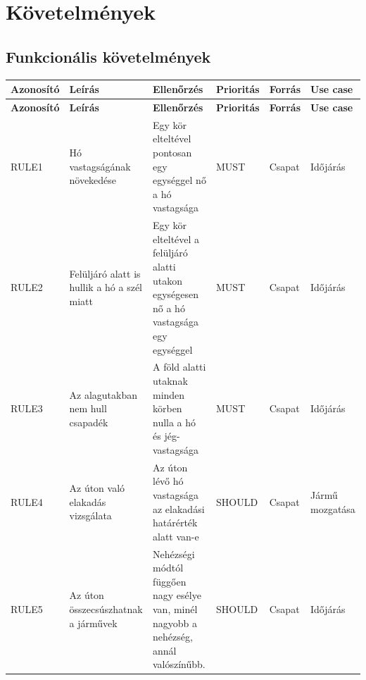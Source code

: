 \section{Követelmények}
\subsection{Funkcionális követelmények}

\begin{longtable}{| p{2cm} | p{4cm} | p{2.7cm} | p{2cm} | p{1.5cm} | p{2.0cm}|}
    \hline
    \textbf{Azonosító} & \textbf{Leírás} & \textbf{Ellenőrzés} & \textbf{Prioritás} & \textbf{Forrás} & \textbf{Use case}\\ 
    \hline
    \endfirsthead

    \hline
    \textbf{Azonosító} & \textbf{Leírás} & \textbf{Ellenőrzés} & \textbf{Prioritás} & \textbf{Forrás} & \textbf{Use case}\\ 
    \hline
    \endhead

    
    RULE1 & %
    Hó vastagságának növekedése& %
    Egy kör elteltével pontosan egy egységgel nő a hó vastagsága & %
    MUST & %
    Csapat & %
    Időjárás \\ %
    \hline
    
    RULE2 & %
    Felüljáró alatt is hullik a hó a szél miatt& %
    Egy kör elteltével a felüljáró alatti utakon egységesen nő a hó vastagsága egy egységgel & %
    MUST & %
    Csapat & %
    Időjárás \\ %
    \hline
	
    RULE3 & %
    Az alagutakban nem hull csapadék& %
    A föld alatti utaknak minden körben nulla a hó és jég-vastagsága & %
    MUST & %
    Csapat & %
    Időjárás \\ %
    \hline

    RULE4 & %
    Az úton való elakadás vizsgálata & %
    Az úton lévő hó vastagsága az elakadási határérték alatt van-e & %
    SHOULD & %
    Csapat & %
    Jármű mozgatása \\ %
    \hline
    
    RULE5 & %
    Az úton összecsúszhatnak a járművek & %
    Nehézségi módtól függően nagy esélye van, minél nagyobb a nehézség, annál valószínűbb. & %
    SHOULD & %
    Csapat & %
    Időjárás \\ %
    \hline
    

\end{longtable}
